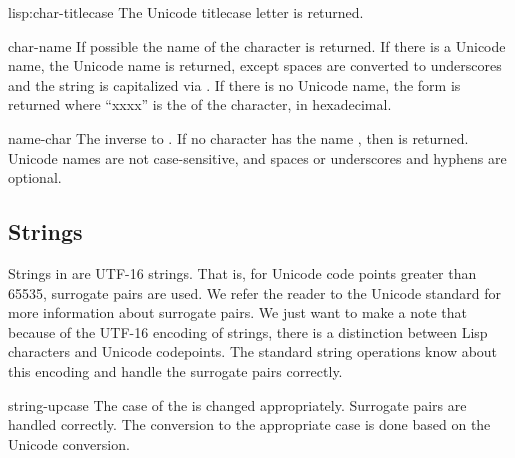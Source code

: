 \begin{defun}{lisp:}{char-titlecase}{\args {}}
  The Unicode titlecase letter is returned.
\end{defun}

\begin{defun}{}{char-name}{\args {}}
   If possible the name of the character  is returned.  If
   there is a Unicode name, the Unicode name is returned, except
   spaces are converted to underscores and the string is capitalized
   via .  If there is no Unicode name, the
   form  is returned where ``xxxx'' is the
    of the character, in hexadecimal.
\end{defun}

\begin{defun}{}{name-char}{\args {}}
  The inverse to .  If no character has the name
  , then \nil{} is returned.  Unicode names are not
  case-sensitive, and spaces or underscores and hyphens are optional.
\end{defun}
\subsection{Strings}

Strings in \cmucl{} are UTF-16 strings.  That is, for Unicode code
points greater than 65535, surrogate pairs are used.  We refer the
reader to the Unicode standard for more information about surrogate
pairs.  We just want to make a note that because of the UTF-16
encoding of strings, there is a distinction between Lisp characters
and Unicode codepoints.  The standard string operations know about
this encoding and handle the surrogate pairs correctly.


\begin{defun}{}{string-upcase}{\args {} }
  The case of the  is changed appropriately.  Surrogate
  pairs are handled correctly.  The conversion to the appropriate case
  is done based on the Unicode conversion.
\end{defun}

